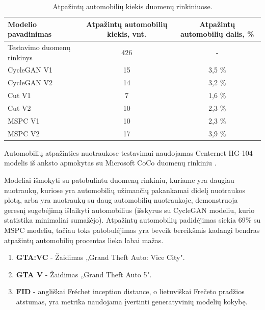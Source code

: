 \documentclass{VUMIFPSkursinis}
\begin{document}
            \begin{table}[H]
                \footnotesize
                \centering
                \caption{Atpažintų automobilių kiekis duomenų rinkiniuose.}
                {\begin{tabular}{|l|c|c|} \hline
                    Modelio pavadinimas & Atpažintų automobilių kiekis, vnt. & Atpažintų automobilių dalis, \% \\
                    \hline
                    Testavimo duomenų rinkinys & 426 & - \\
                    CycleGAN V1 & 15 & 3,5 \% \\
                    CycleGAN V2 & 14 & 3,2 \% \\
                    Cut V1 & 7 & 1,6 \% \\
                    Cut V2 & 10 & 2,3 \% \\ 
                    MSPC V1 & 10 & 2,3 \% \\
                    MSPC V2 & 17 & 3,9 \% \\
                    \hline
                    \end{tabular}
                }
                \label{tab:table example}
            \end{table}
            Automobilių atpažinties nuotraukose testavimui naudojamas Centernet HG-104 \cite{CenterNet} modelis iš anksto apmokytas su Microsoft CoCo duomenų rinkiniu \cite{CocoDataset}.
            
            Modeliai išmokyti su patobulintu duomenų rinkiniu, kuriame yra daugiau nuotraukų, kuriose yra automobilių užimančių pakankamai didelį nuotraukos plotą, arba yra nuotraukų su daug automobilių nuotraukoje, demonstruoja geresnį sugebėjimą išlaikyti automobilius (išskyrus su CycleGAN modeliu, kurio statistika minimaliai sumažėjo). Atpažintų automobilių padidėjimas siekia 69\% su MSPC modeliu, tačiau toks patobulėjimas yra beveik bereikšmis kadangi bendras atpažintų automobilių procentas lieka labai mažas.

            

\begin{enumerate}
\item \textbf{GTA:VC} - Žaidimas „Grand Theft Auto: Vice City".
\item \textbf{GTA V} - Žaidimas „Grand Theft Auto 5".
\item \textbf{FID} - angliškai Fréchet inception distance, o lietuviškai Frečeto pradžios atstumas, yra metrika naudojama įvertinti generatyvinių modelių kokybę.
\end{enumerate}

\printbibliography[heading=bibintoc]
\end{document}
